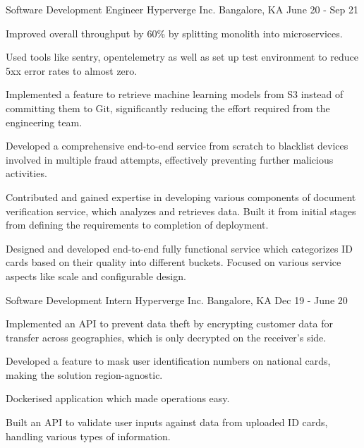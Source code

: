 \begin{cventries}
  \cventry
    {Software Development Engineer}
    {Hyperverge Inc.}
    {Bangalore, KA}
    {June 20 - Sep 21}
    {
      \begin{cvitems}
        \item {Improved overall throughput by 60\% by splitting monolith into microservices.}
        \item {Used tools like sentry, opentelemetry as well as set up test environment to reduce 5xx error rates to almost zero.}
        \item {Implemented a feature to retrieve machine learning models from S3 instead of committing them to Git, significantly reducing the effort required from the engineering team.}
        \item {Developed a comprehensive end-to-end service from scratch to blacklist devices involved in multiple fraud attempts, effectively preventing further malicious activities.}
        \item {Contributed and gained expertise in developing various components of document verification service, which analyzes and retrieves data. Built it from initial stages from defining the requirements to completion of deployment.}
        \item {Designed and developed end-to-end fully functional service which categorizes ID cards based on their quality into different buckets. Focused on various service aspects like scale and configurable design.}
      \end{cvitems}
    }

  \cventry
    {Software Development Intern}
    {Hyperverge Inc.}
    {Bangalore, KA}
    {Dec 19 - June 20}
    {
      \begin{cvitems}
        \item {Implemented an API to prevent data theft by encrypting customer data for transfer across geographies, which is only decrypted on the receiver's side.}
        \item {Developed a feature to mask user identification numbers on national cards, making the solution region-agnostic.}
        \item {Dockerised application which made operations easy.}
        \item {Built an API to validate user inputs against data from uploaded ID cards, handling various types of information.}
      \end{cvitems}
    }

\end{cventries}
